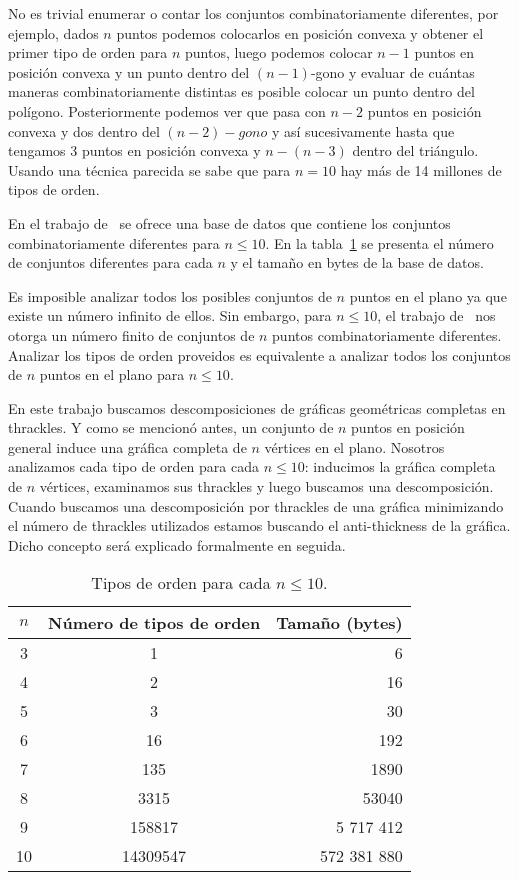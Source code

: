 No es trivial enumerar o contar los conjuntos combinatoriamente diferentes, por ejemplo,
dados $n$ puntos podemos colocarlos en posición convexa y obtener el primer tipo de orden
para $n$ puntos, luego podemos colocar $n-1$ puntos en posición convexa y un punto dentro
del $(n-1)$-gono y evaluar de cuántas maneras combinatoriamente distintas es posible colocar
un punto dentro del polígono. Posteriormente podemos ver que pasa con $n-2$ puntos
en posición convexa y dos dentro del $(n-2)-gono$ y así sucesivamente hasta que tengamos 3 puntos en posición
convexa y $n-(n-3)$ dentro del triángulo. Usando una técnica parecida se sabe que para $n=10$
hay más de 14 millones de tipos de orden.

En el trabajo de~\cite{Aichholzer2002} se ofrece una base de datos que contiene los conjuntos
combinatoriamente diferentes para $n\leq 10$. En la tabla~\ref{tab:ots} se presenta el número
de conjuntos diferentes para cada $n$ y el tamaño en bytes de la base de datos.

Es imposible analizar todos los posibles conjuntos de $n$ puntos en el plano
ya que existe un número infinito de ellos. Sin embargo, para $n\leq 10$, el trabajo de~\cite{Aichholzer2002}
nos otorga un número finito de conjuntos de $n$ puntos combinatoriamente diferentes.
Analizar los tipos de orden proveidos es equivalente a analizar todos los conjuntos de $n$ puntos
en el plano para $n\leq 10$.

En este trabajo buscamos descomposiciones de gráficas geométricas completas en thrackles.
Y como se mencionó antes, un conjunto de $n$ puntos en posición general
induce una gráfica completa de $n$ vértices en el plano. Nosotros analizamos
cada tipo de orden para cada $n\leq 10$: inducimos la gráfica completa de $n$ vértices,
examinamos sus thrackles y luego buscamos una descomposición. Cuando buscamos
una descomposición por thrackles de una gráfica minimizando el número de thrackles utilizados
estamos buscando el anti-thickness de la gráfica. Dicho concepto será explicado
formalmente en seguida.
\begin{table}[ht]
  \centering
  \begin{tabular}{|c|c|r|}
  \hline
  $n$ & Número de tipos de orden & Tamaño (bytes)   \\ \hline
  3     & 1                   & 6       \\ \hline
  4     & 2                   & 16      \\ \hline
  5     & 3                   & 30      \\ \hline
  6     & 16                  & 192     \\ \hline
  7     & 135                 & 1890    \\ \hline
  8     & 3315                & 53040   \\ \hline
  9     & 158817              &	5 717 412   \\\hline
  10    & 14309547            & 572 381 880 \\ \hline
  \end{tabular}
  \caption{Tipos de orden para cada $n\leq10$.}
  \label{tab:ots}
\end{table}

